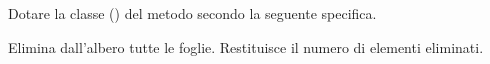 Dotare la classe  () del metodo  secondo la seguente specifica.

\begin{methodslist}

 {
Elimina dall'albero tutte le foglie. Restituisce il numero di elementi eliminati.
}

\end{methodslist}